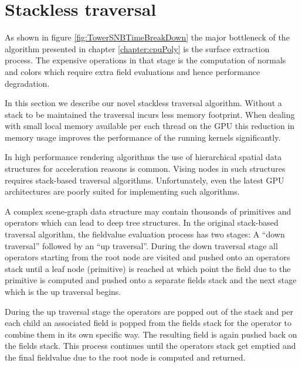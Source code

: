 \section{Stackless \blob traversal}
\label{sec:stackless}
As shown in figure \ref{fig:TowerSNBTimeBreakDown} the major bottleneck of the algorithm presented in chapter 
\ref{chapter:cpuPoly} is the surface extraction process. The expensive operations in that 
stage is the computation of normals and colors which require extra field evaluations and hence performance degradation. 

In this section we describe our novel stackless \blob traversal algorithm. 
Without a stack to be maintained the \blob traversal incurs less memory footprint. When dealing with small 
local memory available per each thread on the GPU this reduction in memory usage improves the performance of the 
running kernels significantly.

In high performance rendering algorithms the use of hierarchical spatial data structures for acceleration reasons 
is common. Vising nodes in such structures requires stack-based traversal algorithms. Unfortunately, even the latest 
GPU architectures are poorly suited for implementing such algorithms. 

A complex \blob scene-graph data structure may contain thousands of primitives and operators which can lead to deep tree structures. 
In the original stack-based traversal algorithm, the fieldvalue evaluation process has two stages: A ``down traversal'' followed by an ``up traversal''. 
During the down traversal stage all operators starting from the root node are visited and pushed onto an operators stack until a leaf node (primitive) 
is reached at which point the field due to the primitive is computed and pushed onto a separate fields stack and the next 
stage which is the up traversal begins.

During the up traversal stage the operators are popped out of the stack and per each child an associated field is popped from the fields stack for the 
operator to combine them in its own specific way. The resulting field is again pushed back on the fields stack.  This process continues until the 
operators stack get emptied and the final fieldvalue due to the root node is computed and returned.

